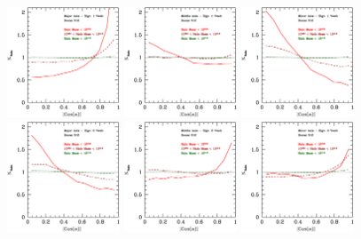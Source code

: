 \documentclass[usenatbib]{mn2e}
\begin{document}
\begin{figure}
\includegraphics[width=0.30\textwidth]{../plot2/Ax1_VT/512_AX1_V1.ps}
\includegraphics[width=0.30\textwidth]{../plot2/Ax2_VT/512_AX2_V1.ps}
\includegraphics[width=0.30\textwidth]{../plot2/Ax3_VT/512_AX3_V1.ps}
\includegraphics[width=0.30\textwidth]{../plot2/Ax1_VT/512_AX1_V2.ps}
\includegraphics[width=0.30\textwidth]{../plot2/Ax2_VT/512_AX2_V2.ps}
\includegraphics[width=0.30\textwidth]{../plot2/Ax3_VT/512_AX3_V2.ps}

\end{figure}
\end{document}
